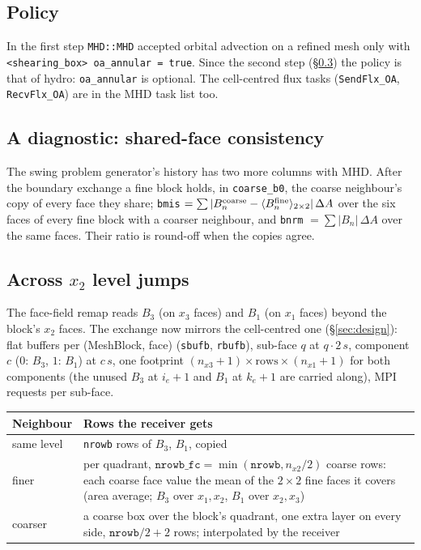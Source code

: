 \documentclass[11pt]{article}
\newcommand{\code}[1]{\texttt{#1}}
\newcommand{\fn}[1]{\texttt{\small #1}}
\begin{document}
\subsection{Policy}
In the first step \fn{MHD::MHD} accepted orbital advection on a refined mesh only with
\code{<shearing\_box> oa\_annular = true}. Since the second step (\S\ref{sec:mhdB}) the
policy is that of hydro: \code{oa\_annular} is optional. The cell-centred flux tasks
(\fn{SendFlx\_OA}, \fn{RecvFlx\_OA}) are in the MHD task list too.

\subsection{A diagnostic: shared-face consistency}
The swing problem generator's history has two more columns with MHD. After the boundary
exchange a fine block holds, in \code{coarse\_b0}, the coarse neighbour's copy of every face
they share; \code{bmis} $= \sum |B_n^{\rm coarse} - \langle B_n^{\rm fine}\rangle_{2\times2}|
\,\Delta A$ over the six faces of every fine block with a coarser neighbour, and
\code{bnrm} $= \sum |B_n|\,\Delta A$ over the same faces. Their ratio is round-off when the
copies agree.

\subsection{Across \texorpdfstring{$x_2$}{x2} level jumps}
\label{sec:mhdB}
The face-field remap reads $B_3$ (on $x_3$ faces) and $B_1$ (on $x_1$ faces) beyond the
block's $x_2$ faces. The exchange now mirrors the cell-centred one
(\S\ref{sec:design}): flat buffers per (MeshBlock, face) (\code{sbufb}, \code{rbufb}),
sub-face $q$ at $q\cdot 2\,s$, component $c$ ($0$: $B_3$, $1$: $B_1$) at $c\,s$, one
footprint $(n_{x3}{+}1)\times\text{rows}\times(n_{x1}{+}1)$ for both components (the unused
$B_3$ at $i_e{+}1$ and $B_1$ at $k_e{+}1$ are carried along), MPI requests per sub-face.

\begin{center}
\small
\begin{tabular}{@{}lp{11cm}@{}}
\toprule
Neighbour & Rows the receiver gets \\
\midrule
same level & \code{nrowb} rows of $B_3$, $B_1$, copied \\
finer      & per quadrant, $\code{nrowb\_fc} = \min(\code{nrowb}, n_{x2}/2)$ coarse rows:
             each coarse face value the mean of the $2\times2$ fine faces it covers
             (area average; $B_3$ over $x_1, x_2$, $B_1$ over $x_2, x_3$) \\
coarser    & a coarse box over the block's quadrant, one extra layer on every side,
             $\code{nrowb}/2 + 2$ rows; interpolated by the receiver \\
\bottomrule
\end{tabular}
\end{center}
\end{document}
